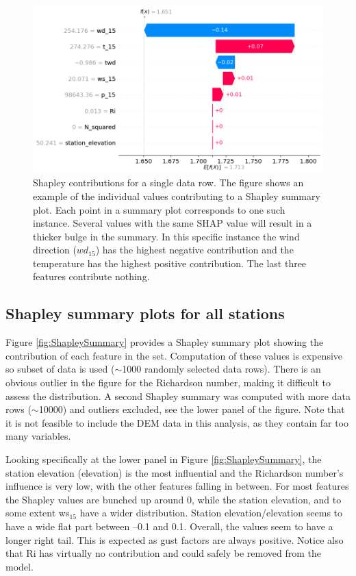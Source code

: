 \begin{figure}
  \centering
  \includegraphics[scale = 0.6]{Figures/shap_plots/waterfall_plot.png}
  \caption[Shapley contributions for a single observation]{Shapley contributions for a single data row. The figure shows an example of the individual values contributing to a Shapley summary plot. Each point in a summary plot corresponds to one such instance. Several values with the same SHAP value will result in a thicker bulge in the summary. In this specific instance the wind direction ($wd_{15}$) has the highest negative contribution and the temperature has the highest positive contribution. The last three features contribute nothing.}
  \label{fig:ShapleyWaterfall}
\end{figure}

\subsection{Shapley summary plots for all stations}
Figure \ref{fig:ShapleySummary} provides a Shapley summary plot showing the contribution of each feature in the set. Computation of these values is expensive so subset of data is used ($\sim$1000 randomly selected data rows). There is an obvious outlier in the figure for the Richardson number, making it difficult to assess the distribution. A second Shapley summary was computed with more data rows ($\sim$10000) and outliers excluded, see the lower panel of the figure. Note that it is not feasible to include the DEM data in this analysis, as they contain far too many variables.

Looking specifically at the lower panel in Figure \ref{fig:ShapleySummary}, the station elevation (elevation) is the most influential and the Richardson number's influence is very low, with the other features falling in between. For most features the Shapley values are bunched up around 0, while the station elevation, and to some extent ws$_{15}$ have a wider distribution. Station elevation/elevation seems to have a wide flat part between –0.1 and 0.1. Overall, the values seem to have a longer right tail. This is expected as gust factors are always positive. Notice also that Ri has virtually no contribution and could safely be removed from the model.

